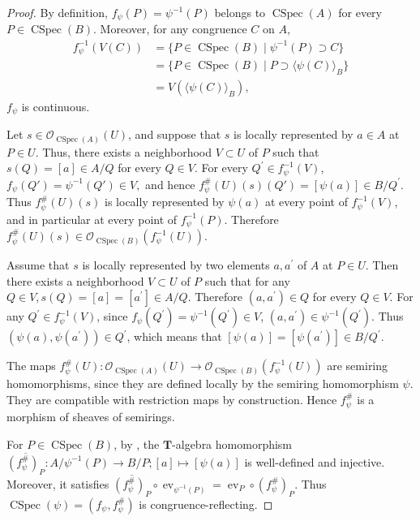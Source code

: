 \documentclass[a4paper,12pt]{amsart}
\theoremstyle{plain}
\theoremstyle{definition}
\begin{document}
\begin{proof}
By definition, $f_{\psi}(P) = \psi^{-1}(P)$ belongs to $\operatorname{CSpec}(A)$ for every $P \in \operatorname{CSpec}(B)$.
Moreover, for any congruence $C$ on $A$,
\begin{align*}
f_{\psi}^{-1}(V(C))
&=
\{P\in\operatorname{CSpec}(B)\mid \psi^{-1}(P)\supset C\}\\
&=
\{P\in\operatorname{CSpec}(B)\mid P\supset\langle\psi(C)\rangle_B\}\\
&=
V(\langle\psi(C)\rangle_B),
\end{align*}
$f_{\psi}$ is continuous.

Let $s\in\mathcal{O}_{\operatorname{CSpec}(A)}(U)$, and suppose that $s$ is locally represented by $a\in A$ at $P\in U$.
Thus, there exists a neighborhood $V\subset U$ of $P$ such that $s(Q)=[a]\in A/Q$ for every $Q\in V$.
For every $Q^{\prime} \in f_\psi^{-1}(V)$, $f_{\psi}(Q')=\psi^{-1}(Q')\in V,$ and hence $f_{\psi}^{\#}(U)(s)(Q') = [\psi(a)]\in B/Q^{\prime}$.
Thus $f_{\psi}^{\#}(U)(s)$ is locally represented by $\psi(a)$ at every point of $f_{\psi}^{-1}(V)$, and in particular at every point of $f_{\psi}^{-1}(P)$.
Therefore $f_{\psi}^{\#}(U)(s) \in \mathcal{O}_{\operatorname{CSpec}(B)}(f_{\psi}^{-1}(U))$.

Assume that $s$ is locally represented by two elements $a, a^{\prime}$ of $A$ at $P \in U$.
Then there exists a neighborhood $V \subset U$ of $P$ such that for any $Q \in V, s(Q) = [a] = [a^{\prime}] \in A / Q$.
Therefore $(a,a^{\prime}) \in Q$ for every $Q \in V$.
For any $Q^{\prime} \in f_{\psi}^{-1}(V)$, since $f_{\psi}(Q^{\prime}) = \psi^{-1}(Q^{\prime}) \in V$, $(a, a^{\prime}) \in \psi^{-1}(Q^{\prime})$.
Thus $(\psi(a), \psi(a^{\prime})) \in Q^{\prime}$, which means that $[\psi(a)] = [\psi(a^{\prime})] \in B / Q^{\prime}$.

The maps $f_{\psi}^{\#}(U): \mathcal{O}_{\operatorname{CSpec}(A)}(U) \to \mathcal{O}_{\operatorname{CSpec}(B)}(f_{\psi}^{-1}(U))$ are semiring homomorphisms, since they are defined locally by the semiring homomorphism $\psi$.
They are compatible with restriction maps by construction.
Hence $f_{\psi}^{\#}$ is a morphism of sheaves of semirings.

For $P \in \operatorname{CSpec}(B)$, by \cite[Proposition 2.4.4]{Giansiracusa=Giansiracusa2}, the $\boldsymbol{T}$-algebra homomorphism $\overline{(f_{\psi}
^{\#})_P} : A / \psi^{-1}(P) \to B/P; [a] \mapsto [\psi(a)]$ is well-defined and injective.
Moreover, it satisfies $\overline{(f_{\psi}^{\#})_P} \circ \operatorname{ev}_{\psi^{-1}(P)} = \operatorname{ev}_{P} \circ (f_{\psi}^{\#})_P$.
Thus $\operatorname{CSpec}(\psi)=(f_{\psi}, f_{\psi}^{\#})$ is congruence-reflecting.


\end{proof}
\end{document}
